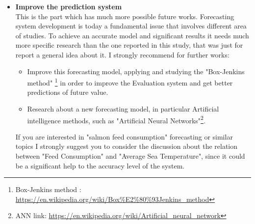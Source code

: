 \begin{itemize}
\newpage

\item \textbf{Improve the prediction system}\\ This is the part which has much more possible future works. Forecasting system development is today a fundamental issue that involves different area of studies. To achieve an accurate model and significant results it needs much more specific research than the one reported in this study, that was just for report a general idea about it. I strongly recommend for further works:
\begin{itemize}
\item Improve this forecasting model, applying and studying the "Box-Jenkins method" \footnote{Box-Jenkins method : \url{https://en.wikipedia.org/wiki/Box\%E2\%80\%93Jenkins\_method}} in order to improve the Evaluation system and get better predictions of future value.
\item Research about a new forecasting model, in particular Artificial intelligence methods, such as "Artificial Neural Networks"\footnote{ANN link: \url{https://en.wikipedia.org/wiki/Artificial\_neural\_network}}.
\end{itemize}

If you are interested in "salmon feed consumption" forecasting or similar topics I strongly suggest you to consider the discussion about the relation between "Feed Consumption" and "Average Sea Temperature", since it could be a significant help to the accuracy level of the system.

\end{itemize}




